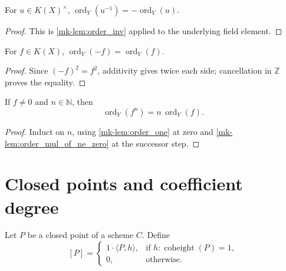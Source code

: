 \begin{lemma}
  \label{mk-lem:order_units_inv}
  \leanok

  For \(u\in K(X)^\times\),
  \(\operatorname{ord}_Y(u^{-1})=-\operatorname{ord}_Y(u)\).
\end{lemma}
\begin{proof}
  \leanok
  This is \ref{mk-lem:order_inv} applied to the underlying field element.
\end{proof}

\begin{lemma}
  \label{mk-lem:order_neg}
  \leanok

  For \(f\in K(X)\),
  \(\operatorname{ord}_Y(-f)=\operatorname{ord}_Y(f)\).
\end{lemma}
\begin{proof}
  \leanok
  Since \((-f)^2=f^2\), additivity gives twice each side; cancellation in
  \(\mathbb Z\) proves the equality.
\end{proof}

\begin{lemma}
  \label{mk-lem:order_pow_of_ne_zero}
  \leanok

  If \(f\neq0\) and \(n\in\mathbb N\), then
  \[
    \operatorname{ord}_Y(f^n)=n\,\operatorname{ord}_Y(f).
  \]
\end{lemma}
\begin{proof}
  \leanok
  Induct on \(n\), using \ref{mk-lem:order_one} at zero and
  \ref{mk-lem:order_mul_of_ne_zero} at the successor step.
\end{proof}

\section{Closed points and coefficient degree}

\begin{definition}
  \label{mk-def:divisor_closed_point}
  \leanok


  Let \(P\) be a closed point of a scheme \(C\).  Define
  \[
    [P]=
    \begin{cases}
      1\cdot\langle P,h\rangle,&
        \text{if }h:\operatorname{coheight}(P)=1,\\
      0,&\text{otherwise.}
    \end{cases}
  \]
\end{definition}

